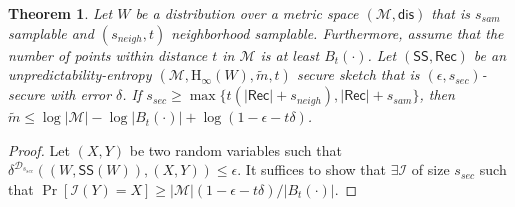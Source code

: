 \documentclass[11pt]{article}
\newcommand{\class}[1]{{\ensuremath{\mathsf{#1}}}}
\newcommand{\sketch}{\ensuremath{\class{SS}}\xspace}
\newcommand{\rec}{\ensuremath{\class{Rec}}\xspace}
\newcommand{\dis}{\ensuremath{\mathsf{dis}}}
\newcommand{\Hoo}{\mathrm{H}_\infty}
\newtheorem{theorem}{Theorem}[section]
\begin{document}
\begin{theorem}
Let $W$ be a distribution over a metric space $(\mathcal{M}, \dis)$ that is $s_{sam}$ samplable and $(s_{neigh}, t)$ neighborhood samplable.  Furthermore, assume that the number of points within distance $t$ in $\mathcal{M}$ is at least $B_t(\cdot)$.  Let $(\sketch, \rec)$ be an unpredictability-entropy $(\mathcal{M}, \Hoo(W), \tilde{m}, t)$ secure sketch that is $(\epsilon, s_{sec})$-secure with error $\delta$.  If $s_{sec} \geq \max\{ t(|\rec| +s_{neigh}), |\rec| + s_{sam}\}$, then $\tilde{m}\leq \log |\mathcal{M}| - \log |B_t(\cdot)| + \log(1-\epsilon -t\delta)$.
\end{theorem}
\begin{proof}
Let $(X, Y)$ be two random variables such that $\delta^{\mathcal{D}_{s_{sec}}}((W, \sketch(W)), (X, Y))\leq \epsilon$.  It suffices to show that $\exists \mathcal{I}$ of size $s_{sec}$ such that $\Pr[\mathcal{I}(Y) = X]\geq |\mathcal{M}| (1-\epsilon -t\delta) / |B_t(\cdot)|$.  


\end{proof}
\end{document}
